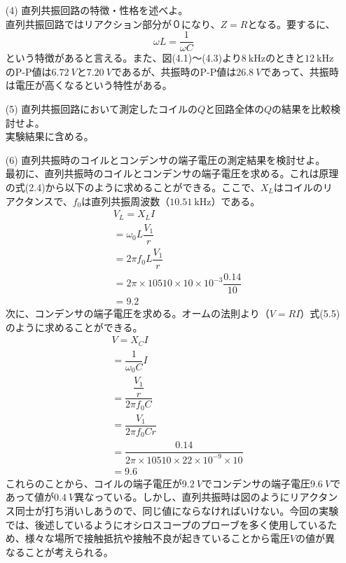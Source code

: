 \documentclass[12pt,a4paper]{jsarticle}
\numberwithin{equation}{section}
\numberwithin{figure}{section}
\numberwithin{table}{section}
\begin{document}
\begin{itemize}
    \item [(4)]直列共振回路の特徴・性格を述べよ。\\直列共振回路ではリアクション部分が０になり、$Z=R$となる。要するに、
    \begin{equation}
      \omega L=\dfrac{1}{\omega C}
    \end{equation}
    という特徴があると言える。また、図(4.1)～(4.3)より$\SI{8}{\kilo\hertz}$のときと$\SI{12}{\kilo\hertz}$のP-P値は$\SI{6.72}{V}$と$\SI{7.20}{V}$であるが、共振時のP-P値は$\SI{26.8}{V}$であって、共振時は電圧が高くなるという特性がある。
    \item [(5)]直列共振回路において測定したコイルの$Q$と回路全体の$Q$の結果を比較検討せよ。\\実験結果に含める。
    \item [(6)]直列共振時のコイルとコンデンサの端子電圧の測定結果を検討せよ。\\最初に、直列共振時のコイルとコンデンサの端子電圧を求める。これは原理の式(2.4)から以下のように求めることができる。ここで、$X_L$はコイルのリアクタンスで、$f_0$は直列共振周波数（$\SI{10.51}{\kilo\hertz}$）である。
    \begin{equation}
      \begin{split}
        &V_L=X_LI\\
        &=\omega_0L \dfrac{V_1}{r}\\
        &=2 \pi f_0 L \dfrac{V_1}{r}\\
        &=2 \pi \times 10510 \times 10 \times 10^{-3} \dfrac{0.14}{10}\\
        &=9.2
      \end{split}
    \end{equation}
    次に、コンデンサの端子電圧を求める。オームの法則より（$V=RI$）式(5.5)のように求めることができる。
    \begin{equation}
      \begin{split}
        &V=X_CI\\
        &=\dfrac{1}{\omega_0C}I\\
        &=\dfrac{\dfrac{V_1}{r}}{2 \pi f_0 C}\\
        &=\dfrac{V_1}{2 \pi f_0 C r}\\
        &=\dfrac{0.14}{2 \pi \times 10510 \times 22 \times 10^{-9} \times 10}\\
        &=9.6
      \end{split}
    \end{equation}
    これらのことから、コイルの端子電圧が$\SI{9.2}{V}$でコンデンサの端子電圧$\SI{9.6}{V}$であって値が$\SI{0.4}{V}$異なっている。しかし、直列共振時は図のようにリアクタンス同士が打ち消いしあうので、同じ値にならなければいけない。今回の実験では、後述しているようにオシロスコープのプローブを多く使用しているため、様々な場所で接触抵抗や接触不良が起きていることから電圧$V$の値が異なることが考えられる。

\end{itemize}
\end{document}
